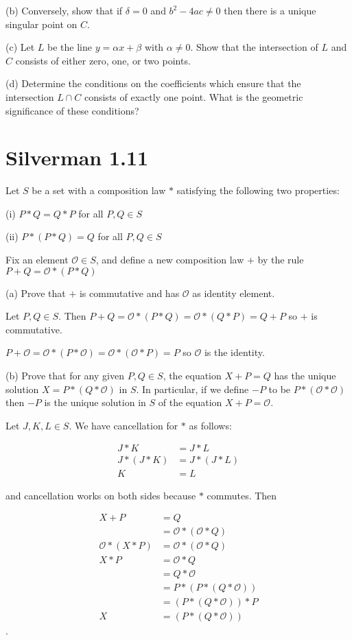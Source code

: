 \documentclass{article}
\begin{document}
(b) Conversely, show that if $\delta = 0$ and $b^2 - 4ac \neq 0$ then there is a unique singular point on $C$.

(c) Let $L$ be the line $y = \alpha x + \beta$ with $\alpha \neq 0$. Show that the intersection of $L$ and $C$ consists of either zero, one, or two points.

(d) Determine the conditions on the coefficients which ensure that the intersection $L \cap C$ consists of exactly one point. What is the geometric significance of these conditions?

\section{Silverman 1.11}
Let $S$ be a set with a composition law $*$ satisfying the following two properties:

(i) $P*Q = Q*P$ for all $P,Q \in S$

(ii) $P*(P*Q) = Q$ for all $P,Q \in S$

Fix an element $\mathcal{O} \in S$, and define a new composition law $+$ by the rule $P+Q = \mathcal{O} * (P * Q)$

(a) Prove that $+$ is commutative and has $\mathcal{O}$ as identity element.

Let $P,Q \in S$. Then $P+Q = \mathcal{O} * (P * Q) = \mathcal{O} * (Q * P) = Q+P$ so $+$ is commutative.

$P + \mathcal{O} = \mathcal{O} * (P * \mathcal{O}) = \mathcal{O} * (\mathcal{O} * P) = P$ so $\mathcal{O}$ is the identity.

(b) Prove that for any given $P,Q \in S$, the equation $X+P = Q$ has the unique solution $X = P*(Q*\mathcal{O})$ in $S$. In particular, if we define $-P$ to be $P*(\mathcal{O} * \mathcal{O})$ then $-P$ is the unique solution in $S$ of the equation $X+P = \mathcal{O}$.

Let $J, K, L \in S$. We have cancellation for $*$ as follows:

\begin{align*}
J * K &= J * L\\
J * (J * K) &= J * (J * L)\\
K &= L
\end{align*}

and cancellation works on both sides because $*$ commutes. Then

\begin{align*}
X+P & = Q \\
& = \mathcal{O} * (\mathcal{O} * Q) \\
\mathcal{O} * (X * P) &= \mathcal{O} * (\mathcal{O} * Q) \\
X * P &= \mathcal{O} * Q \\
&= Q * \mathcal{O} \\
&= P * (P * (Q * \mathcal{O})) \\
&= (P * (Q * \mathcal{O})) * P \\
X &= (P * (Q * \mathcal{O}))
\end{align*}.
\end{document}
